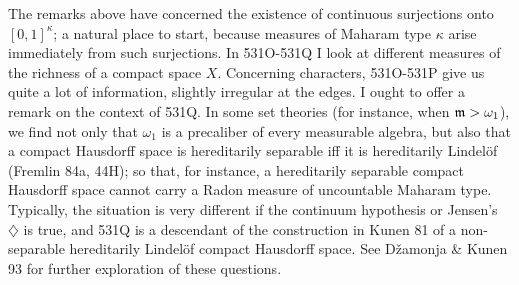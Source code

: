 {The remarks above have concerned the existence of continuous surjections
onto $[0,1]^{\kappa}$;  a natural place to start, because measures of
Maharam type $\kappa$ arise immediately from such surjections.   In
531O-531Q %
I look at different measures of the richness of a compact space $X$.
Concerning characters, 531O-531P give us quite a lot of information,
slightly irregular at the edges.   I ought to offer a remark on the
context of 531Q.
In some set theories (for instance, when $\frak m>\omega_1$), we find
not only that $\omega_1$ is a precaliber of every measurable algebra,
but also that a compact Hausdorff space is hereditarily separable iff it is
hereditarily Lindel\"of ({\smc Fremlin 84a}, 44H);  so that, for
instance, a hereditarily separable compact Hausdorff space cannot carry
a Radon measure of uncountable Maharam type.   Typically, the situation
is very different if the continuum hypothesis or
Jensen's $\diamondsuit$ is true,
and 531Q is a descendant of the construction in {\smc Kunen 81} of a
non-separable hereditarily Lindel\"of compact Hausdorff space.   See
{\smc D\v{z}amonja \& Kunen 93} for further
exploration of these questions.
}%


